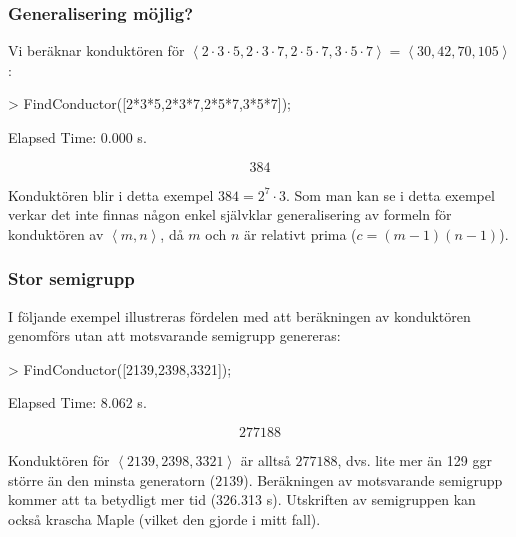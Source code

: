 \documentclass{beamer}
\begin{document}
\begin{frame}
	\frametitle{Generalisering möjlig?}
  	\begin{example}
		Vi beräknar konduktören för $\left<2 \cdot 3 \cdot 5, 2 \cdot 3 \cdot 7, 2 \cdot 5 \cdot 7, 3 \cdot 5 \cdot 7\right> = \left<30, 42, 70, 105\right>$:
  		
  		\begin{semiverbatim}
  			> FindConductor([2*3*5,2*3*7,2*5*7,3*5*7]);
  			
  			
  			Elapsed Time: 0.000 s.
  		\end{semiverbatim}
  		\[384\]
  		
  		Konduktören blir i detta exempel $384 = 2^7 \cdot 3$. Som man kan se i detta exempel verkar det inte finnas någon enkel självklar generalisering av formeln för konduktören av $\left<m, n\right>$, då $m$ och $n$ är relativt prima ($c = (m-1)(n-1)$).
  	\end{example}
\end{frame}

\begin{frame}
	\frametitle{Stor semigrupp}
	\begin{example}
		I följande exempel illustreras fördelen med att beräkningen av konduktören genomförs utan att motsvarande semigrupp genereras:
		
		\begin{semiverbatim}
			> FindConductor([2139,2398,3321]);
			
			
			Elapsed Time: 8.062 s.
		\end{semiverbatim}
		\[277188\]
		
		Konduktören för $\left<2139, 2398, 3321\right>$ är alltså $277188$, dvs. lite mer än 129 ggr större än den minsta generatorn ($2139$). Beräkningen av motsvarande semigrupp kommer att ta betydligt mer tid (326.313 s). Utskriften av semigruppen kan också krascha Maple (vilket den gjorde i mitt fall).
	\end{example}
\end{frame}
\end{document}
